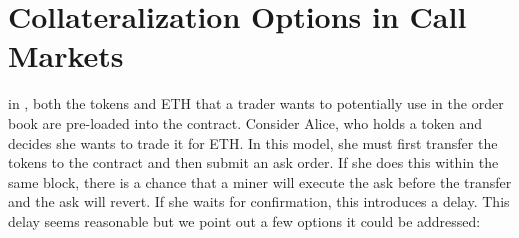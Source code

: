 
\section{Collateralization Options in Call Markets}
\label{app:collateral}

in \cm, both the tokens and ETH that a trader wants to potentially use in the order book are pre-loaded into the contract. Consider Alice, who holds a token and decides she wants to trade it for ETH. In this model, she must first transfer the tokens to the contract and then submit an ask order. If she does this within the same block, there is a chance that a miner will execute the ask before the transfer and the ask will revert. If she waits for confirmation, this introduces a delay. This delay seems reasonable but we point out a few options it could be addressed:

